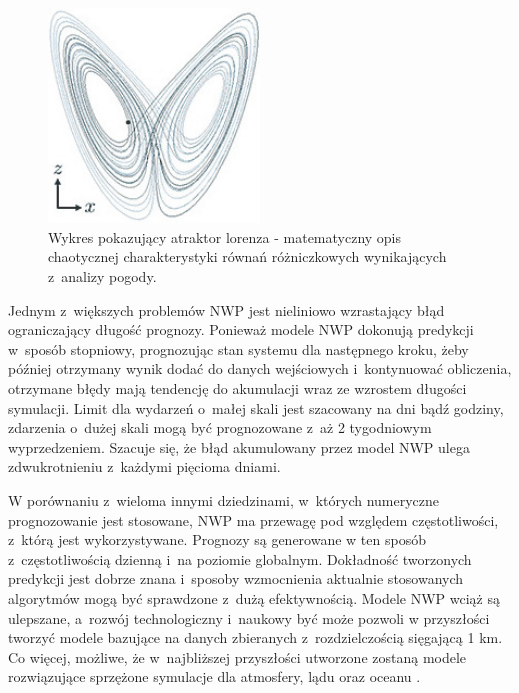 \begin{figure}[H]
    \centering
    \includegraphics[width=0.5\textwidth]{images/lorenz.jpeg}
    \caption[lorenz]{Wykres pokazujący atraktor lorenza - matematyczny opis chaotycznej 
    charakterystyki równań różniczkowych wynikających z~analizy pogody.\footnotemark}
    \label{lorenz}
\end{figure}

Jednym z~większych problemów NWP jest nieliniowo wzrastający błąd ograniczający długość prognozy.
Ponieważ modele NWP dokonują predykcji w~sposób stopniowy, prognozując stan systemu dla następnego
kroku, żeby później otrzymany wynik dodać do danych wejściowych i~kontynuować obliczenia, otrzymane błędy
mają tendencję do akumulacji wraz ze wzrostem długości symulacji.
Limit dla wydarzeń o~małej skali jest szacowany na dni bądź godziny, zdarzenia o~dużej skali
mogą być prognozowane z~aż 2 tygodniowym wyprzedzeniem. Szacuje się, że błąd akumulowany przez 
model NWP ulega zdwukrotnieniu z~każdymi pięcioma dniami.

W porównaniu z~wieloma innymi dziedzinami, w~których numeryczne prognozowanie jest stosowane,
NWP ma przewagę pod względem częstotliwości, z~którą jest wykorzystywane. Prognozy są generowane
w ten sposób z~częstotliwością dzienną i~na poziomie globalnym. Dokładność tworzonych predykcji jest
dobrze znana i~sposoby wzmocnienia aktualnie stosowanych algorytmów mogą być sprawdzone z~dużą
efektywnością. Modele NWP wciąż są ulepszane, a~rozwój technologiczny i~naukowy być może pozwoli
w przyszłości tworzyć modele bazujące na danych zbieranych z~rozdzielczością sięgającą 1 km. Co więcej,
możliwe, że w~najbliższej przyszłości utworzone zostaną modele rozwiązujące sprzężone symulacje
dla atmosfery, lądu oraz oceanu \cite{nwp-the-quiet-revolution}.

